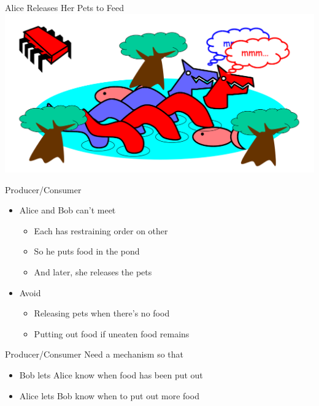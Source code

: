 \begin{frame}{Alice Releases Her Pets to Feed}
  \includegraphics[width=\textwidth]{figures/pets-3}
\end{frame}

\begin{frame}{Producer/Consumer}
  \begin{itemize}
  \item   Alice and Bob can't meet
    \begin{itemize}
    \item Each has restraining order on other
    \item So he puts food in the pond
    \item And later, she releases the pets
    \end{itemize}
  \item Avoid
    \begin{itemize}
    \item Releasing pets when there's no food
    \item Putting out food if uneaten food remains
    \end{itemize}
  \end{itemize}
\end{frame}

\begin{frame}{Producer/Consumer}
  Need a mechanism so that


  \begin{itemize}
  \item Bob lets Alice know when food has been put out
  \item Alice lets Bob know when to put out more food  
  \end{itemize}
\end{frame}

